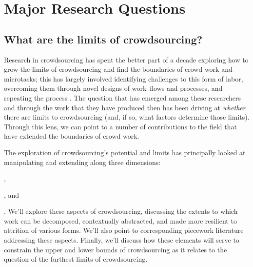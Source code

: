 \documentclass[trackingWork]{subfiles}
\begin{document}
\section{Major Research Questions}

                                     


\subsection{What are the limits of crowdsourcing?}
Research in crowdsourcing has spent the better part of a decade
exploring how to grow the limits of crowdsourcing and
find the boundaries of crowd work and microtasks;
this has largely involved
  identifying challenges to this form of labor,
  overcoming them through novel designs of work--flows and processes, and
  repeating the process
\cite{bernsteinSoylent}.
The question that has emerged
among these researchers and
through the work that they have produced then
has been driving at \textit{whether} there are limits to crowdsourcing
(and, if so, what factors determine those limits).
Through this lens, we can point to
a number of contributions to the field that have extended the boundaries of crowd work.

The exploration of crowdsourcing's potential and limits has principally looked at
manipulating and extending along three dimensions:
\begin{inlinelist}
  \item {},
  \item {}, and
  \item {}
\end{inlinelist}.
We'll explore these aspects of crowdsourcing,
discussing the extents to which work can be
decomposed,
contextually abstracted, and
made more resilient to attrition of various forms.
We'll also point to corresponding piecework literature addressing these aspects.
Finally, we'll discuss how these elements will serve
to constrain the upper and lower bounds of crowdsourcing as it relates
to the question of the furthest limits of crowdsourcing.
\end{document}
